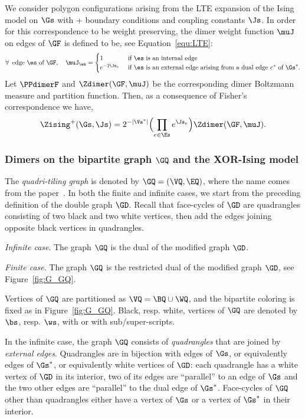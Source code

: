 \documentclass[a4paper,twoside,11pt]{article}
\begin{document}
We consider polygon configurations arising from the LTE expansion of the Ising model on $\Gs$ with + boundary conditions and coupling 
constants $\Js$. In order for this correspondence to be weight preserving, the dimer weight function $\muJ$ on edges of $\GF$ is 
defined to be, see Equation~\eqref{equ:LTE}:
\begin{equation*}
\forall\,\text{ edge $\es$ of $\GF$},\quad 
\muJ_\es=
\begin{cases}
1&\text{ if $\es$ is an internal edge}\\
e^{-2\Js_e}&\text{ if $\es$ is an external edge arising from a dual edge $e^*$ of $\Gs^*$}.
\end{cases}
\end{equation*}
Let $\PPdimerF$ and $\Zdimer(\GF,\muJ)$ be the corresponding dimer Boltzmann measure and partition function. Then, as a consequence
of Fisher's correspondence we have,
\begin{equation}\label{equ:PF_Ising_1}
\Zising^+(\Gs,\Js)=2^{-|\Vs^*|}\Bigl(\prod_{e\in\Es}e^{\Js_e}\Bigr)\Zdimer(\GF,\muJ).
\end{equation}






\subsubsection{Dimers on the bipartite graph $\GQ$ and the XOR-Ising model}\label{sec:def_graph_GQ}

The \emph{quadri-tiling graph} is denoted by $\GQ=(\VQ,\EQ)$, where the name comes from the paper~\cite{deTiliere:quadri}. 
In both the 
finite and infinite cases, we start from the 
preceding definition of the double graph $\GD$. Recall that face-cycles of $\GD$ are quadrangles
consisting of two black and two white vertices, then add the edges joining opposite black vertices in quadrangles.

\emph{Infinite case}. The graph $\GQ$ is the dual of the modified graph $\GD$.

\emph{Finite case}. The graph $\GQ$ is the restricted dual of the modified graph $\GD$, see Figure~\ref{fig:G_GQ}.

Vertices of $\GQ$ are partitioned as $\VQ=\BQ\cup\WQ$, and the bipartite coloring is fixed as in Figure~\ref{fig:G_GQ}. Black, resp. white,
vertices of $\GQ$ are denoted by $\bs$, resp. $\ws$, with or with sub/super-scripts.

In the infinite case, the graph $\GQ$ consists of \emph{quadrangles} that are joined by \emph{external edges}. Quadrangles
are in bijection with edges of $\Gs$, or equivalently edges of $\Gs^*$, or equivalently white vertices of $\GD$: each quadrangle
has a white vertex of $\GD$ in its interior, two of its edges are ``parallel'' to an edge of $\Gs$ and the two other edges are
``parallel'' to the dual edge of $\Gs^*$. Face-cycles of $\GQ$ other than quadrangles either have a vertex of $\Gs$ or a 
vertex of $\Gs^*$ in their interior. 
\end{document}
